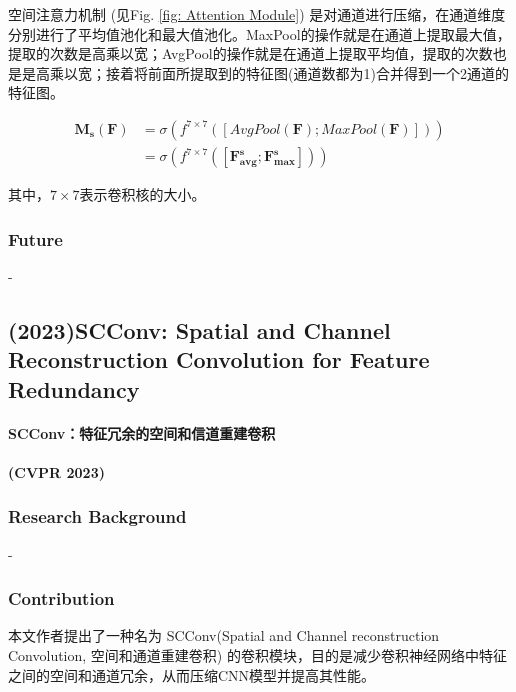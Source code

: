 \documentclass[a4paper, 10pt]{article}
\begin{document}
		空间注意力机制 (见Fig. \ref{fig: Attention Module}) 是对通道进行压缩，在通道维度分别进行了平均值池化和最大值池化。MaxPool的操作就是在通道上提取最大值，提取的次数是高乘以宽；AvgPool的操作就是在通道上提取平均值，提取的次数也是是高乘以宽；接着将前面所提取到的特征图(通道数都为1)合并得到一个2通道的特征图。
		
		\begin{equation}
			\begin{aligned}
				\mathbf{M_s}(\mathbf{F}) &= \sigma \left( f^{7 \times 7}([AvgPool(\mathbf{F});MaxPool(\mathbf{F})]) \right) \\
				&= \sigma \left( f^{7 \times 7}([\mathbf{F^s_{avg}};\mathbf{F^s_{max}}]) \right)
			\end{aligned}
			\label{eq: Spatial Attention Module}
		\end{equation}
		
		其中，$7 \times 7$表示卷积核的大小。
		
		\subsubsection{Future}
		
		-
		
		\subsection{(2023)SCConv: Spatial and Channel Reconstruction Convolution for Feature Redundancy}
		
		\paragraph{SCConv：特征冗余的空间和信道重建卷积 }
		
		\paragraph{(CVPR 2023)}
		
		\subsubsection{Research Background}
		
		-
		
		\subsubsection{Contribution}
		
		本文作者提出了一种名为 SCConv(Spatial and Channel reconstruction Convolution, 空间和通道重建卷积) 的卷积模块，目的是减少卷积神经网络中特征之间的空间和通道冗余，从而压缩CNN模型并提高其性能。
		
\end{document}
